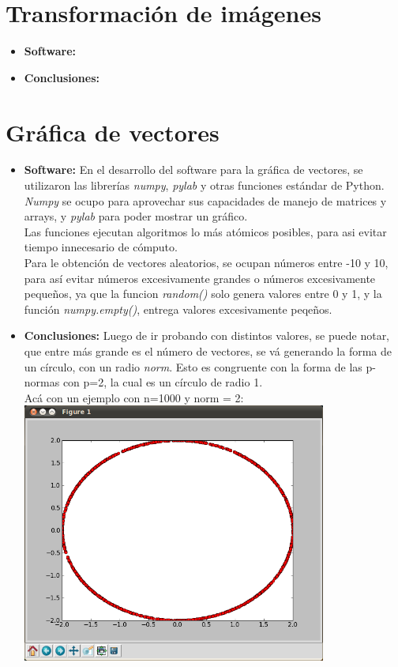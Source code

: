 \documentclass[12pt,letterpaper]{article}
\begin{document}
\section{Transformación de imágenes}
\begin{itemize}
\item \textbf{Software:} 
\item \textbf{Conclusiones:} 
\end{itemize}

\section{Gráfica de vectores}
\begin{itemize}
\item \textbf{Software:} En el desarrollo del software para la gráfica de vectores, se utilizaron las librerías \textit{numpy}, \textit{pylab} y otras funciones estándar de Python. \textit{Numpy} se ocupo para aprovechar sus capacidades de manejo de matrices y arrays, y \textit{pylab} para poder mostrar un gráfico.\\
Las funciones ejecutan algoritmos lo más atómicos posibles, para asi evitar tiempo innecesario de cómputo.\\
Para le obtención de vectores aleatorios, se ocupan números entre -10 y 10, para así evitar números excesivamente grandes o números excesivamente pequeños, ya que la funcion \textit{random()} solo genera valores entre 0 y 1, y la función \textit{numpy.empty()}, entrega valores excesivamente peqeños.
\item \textbf{Conclusiones:} Luego de ir probando con distintos valores, se puede notar, que entre más grande es el número de vectores, se vá generando la forma de un círculo, con un radio \textit{norm}. Esto es congruente con la forma de las p-normas con p=2, la cual es un círculo de radio 1.\\
Acá con un ejemplo con n=1000 y norm = 2:\\\includegraphics[width=10cm]{norm.png}

\end{itemize}
\end{document}
